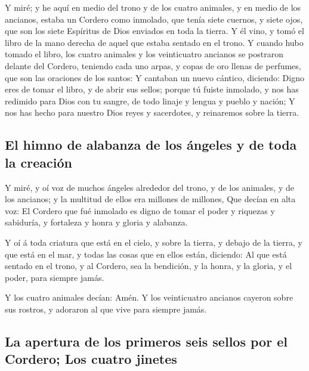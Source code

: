  Y miré; y he aquí en medio del trono y de los cuatro
animales, y en medio de los ancianos, estaba un Cordero como inmolado,
que tenía siete cuernos, y siete ojos, que son los siete Espíritus de
Dios enviados en toda la tierra.  Y él vino, y tomó el libro
de la mano derecha de aquel que estaba sentado en el trono. 
Y cuando hubo tomado el libro, los cuatro animales y los veinticuatro
ancianos se postraron delante del Cordero, teniendo cada uno arpas, y
copas de oro llenas de perfumes, que son las oraciones de los santos:
 Y cantaban un nuevo cántico, diciendo: Digno eres de tomar
el libro, y de abrir sus sellos; porque tú fuiste inmolado, y nos has
redimido para Dios con tu sangre, de todo linaje y lengua y pueblo y
nación;  Y nos has hecho para nuestro Dios reyes y
sacerdotes, y reinaremos sobre la tierra.

\hypertarget{el-himno-de-alabanza-de-los-uxe1ngeles-y-de-toda-la-creaciuxf3n}{%
\subsection{El himno de alabanza de los ángeles y de toda la
creación}\label{el-himno-de-alabanza-de-los-uxe1ngeles-y-de-toda-la-creaciuxf3n}}

 Y miré, y oí voz de muchos ángeles alrededor del trono, y
de los animales, y de los ancianos; y la multitud de ellos era millones
de millones,  Que decían en alta voz: El Cordero que fué
inmolado es digno de tomar el poder y riquezas y sabiduría, y fortaleza
y honra y gloria y alabanza.

 Y oí á toda criatura que está en el cielo, y sobre la
tierra, y debajo de la tierra, y que está en el mar, y todas las cosas
que en ellos están, diciendo: Al que está sentado en el trono, y al
Cordero, sea la bendición, y la honra, y la gloria, y el poder, para
siempre jamás.

 Y los cuatro animales decían: Amén. Y los veinticuatro
ancianos cayeron sobre sus rostros, y adoraron al que vive para siempre
jamás.

\hypertarget{la-apertura-de-los-primeros-seis-sellos-por-el-cordero-los-cuatro-jinetes}{%
\subsection{La apertura de los primeros seis sellos por el Cordero; Los
cuatro
jinetes}\label{la-apertura-de-los-primeros-seis-sellos-por-el-cordero-los-cuatro-jinetes}}

